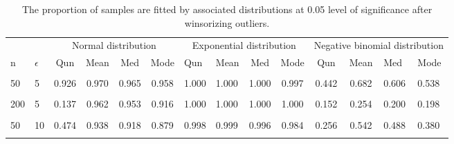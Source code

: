 \documentclass[notitlepage,12pt]{jedm}
\begin{document}
\begin{table}[H]

\caption{\label{tab:unnamed-chunk-8}The proportion of samples are fitted by associated distributions at 0.05 level of significance after winsorizing outliers.}
\centering
\begin{tabular}[t]{l|l|c|c|c|c|l|l|c|c|c|c|l|l}
\hline
\multicolumn{2}{c|}{ } & \multicolumn{4}{c|}{Normal distribution} & \multicolumn{4}{c|}{Exponential distribution} & \multicolumn{4}{c}{Negative binomial distribution} \\
\cline{3-6} \cline{7-10} \cline{11-14}
n & $\epsilon$ & Qun & Mean & Med & Mode & Qun & Mean & Med & Mode & Qun & Mean & Med & Mode\\
\hline
\cellcolor{gray!6}{20} & \cellcolor{gray!6}{5} & \cellcolor{gray!6}{0.961} & \cellcolor{gray!6}{0.970} & \cellcolor{gray!6}{0.949} & \cellcolor{gray!6}{0.924} & \cellcolor{gray!6}{0.999} & \cellcolor{gray!6}{1.000} & \cellcolor{gray!6}{0.996} & \cellcolor{gray!6}{0.984} & \cellcolor{gray!6}{0.748} & \cellcolor{gray!6}{0.912} & \cellcolor{gray!6}{0.878} & \cellcolor{gray!6}{0.848}\\
\hline
50 & 5 & 0.926 & 0.970 & 0.965 & 0.958 & 1.000 & 1.000 & 1.000 & 0.997 & 0.442 & 0.682 & 0.606 & 0.538\\
\hline
\cellcolor{gray!6}{100} & \cellcolor{gray!6}{5} & \cellcolor{gray!6}{0.614} & \cellcolor{gray!6}{0.968} & \cellcolor{gray!6}{0.960} & \cellcolor{gray!6}{0.934} & \cellcolor{gray!6}{1.000} & \cellcolor{gray!6}{1.000} & \cellcolor{gray!6}{1.000} & \cellcolor{gray!6}{1.000} & \cellcolor{gray!6}{0.294} & \cellcolor{gray!6}{0.450} & \cellcolor{gray!6}{0.418} & \cellcolor{gray!6}{0.356}\\
\hline
200 & 5 & 0.137 & 0.962 & 0.953 & 0.916 & 1.000 & 1.000 & 1.000 & 1.000 & 0.152 & 0.254 & 0.200 & 0.198\\
\hline
\cellcolor{gray!6}{20} & \cellcolor{gray!6}{10} & \cellcolor{gray!6}{0.873} & \cellcolor{gray!6}{0.951} & \cellcolor{gray!6}{0.939} & \cellcolor{gray!6}{0.910} & \cellcolor{gray!6}{0.997} & \cellcolor{gray!6}{0.998} & \cellcolor{gray!6}{0.986} & \cellcolor{gray!6}{0.964} & \cellcolor{gray!6}{0.582} & \cellcolor{gray!6}{0.846} & \cellcolor{gray!6}{0.792} & \cellcolor{gray!6}{0.782}\\
\hline
50 & 10 & 0.474 & 0.938 & 0.918 & 0.879 & 0.998 & 0.999 & 0.996 & 0.984 & 0.256 & 0.542 & 0.488 & 0.380\\
\hline
\cellcolor{gray!6}{100} & \cellcolor{gray!6}{10} & \cellcolor{gray!6}{0.060} & \cellcolor{gray!6}{0.890} & \cellcolor{gray!6}{0.873} & \cellcolor{gray!6}{0.805} & \cellcolor{gray!6}{0.998} & \cellcolor{gray!6}{1.000} & \cellcolor{gray!6}{1.000} & \cellcolor{gray!6}{0.998} & \cellcolor{gray!6}{0.090} & \cellcolor{gray!6}{0.352} & \cellcolor{gray!6}{0.314} & \cellcolor{gray!6}{0.234}\\

\end{tabular}
\end{table}
\end{document}
